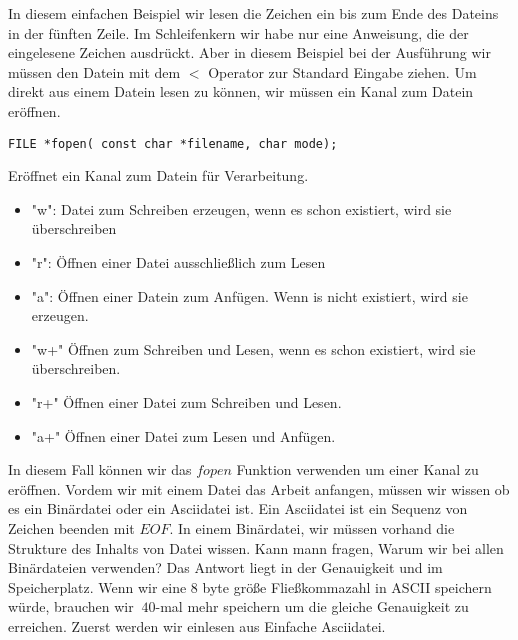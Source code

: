 \documentclass{article}[12pt]
\newenvironment{myexampleblock}[1]{%
    \tcolorbox[beamer,%
    noparskip,breakable,
    colback=White,colframe=ForestGreen,%
    colbacklower=LimeGreen!75!White,%
    title=#1]}%
    {\endtcolorbox}
\begin{document}
In diesem einfachen Beispiel wir lesen die Zeichen ein bis zum Ende des Dateins in der fünften Zeile.
Im Schleifenkern wir habe nur eine Anweisung, die der eingelesene Zeichen ausdrückt. Aber in diesem Beispiel
bei der Ausführung wir müssen den Datein mit dem $<$ Operator zur Standard Eingabe ziehen. Um direkt aus
einem Datein lesen zu können, wir müssen ein Kanal zum Datein eröffnen.
\begin{myexampleblock}{Funktion: \texttt{fopen}}
\begin{lstlisting}
FILE *fopen( const char *filename, char mode);
\end{lstlisting}
\vspace{-0.4cm}
Eröffnet ein Kanal zum Datein für Verarbeitung.
\begin{itemize} 
\itemsep0.5ex
\item "w": Datei zum Schreiben erzeugen, wenn es schon existiert, wird sie überschreiben
\item "r": Öffnen einer Datei ausschließlich zum Lesen
\item "{}a": Öffnen einer Datein zum Anfügen. Wenn is nicht existiert, wird sie erzeugen.
\item "w+" Öffnen zum Schreiben und Lesen, wenn es schon existiert, wird sie überschreiben.
\item "r+" Öffnen einer Datei zum Schreiben und Lesen.
\item "{}a+" Öffnen einer Datei zum Lesen und Anfügen.
\end{itemize}
\end{myexampleblock}  
In diesem Fall können wir das $fopen$ Funktion verwenden um einer Kanal zu eröffnen. Vordem
wir mit einem Datei das Arbeit anfangen, müssen wir wissen ob es ein Binärdatei oder ein Asciidatei
ist. Ein Asciidatei ist ein Sequenz von Zeichen beenden mit $EOF$. In einem Binärdatei, wir müssen vorhand
die Strukture des Inhalts von Datei wissen. Kann mann fragen, Warum wir bei allen Binärdateien verwenden?
Das Antwort liegt in der Genauigkeit und im Speicherplatz. Wenn wir eine 8 byte größe Fließkommazahl in 
ASCII speichern würde, brauchen wir $~40$-mal mehr speichern um die gleiche Genauigkeit zu erreichen. Zuerst 
werden wir einlesen aus Einfache Asciidatei.
\end{document}
